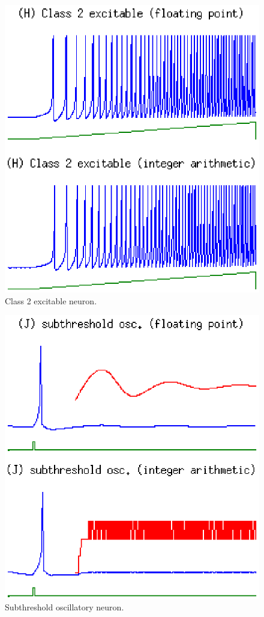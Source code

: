 \documentclass[journal]{./sty/IEEEtran}
\begin{document}
\begin{figure}
\centering
\includegraphics[scale=0.6]{imgs/izh_class_2_excitable}
\caption{Class 2 excitable neuron.\label{fig:excit2}}
\end{figure}

\begin{figure}
\centering
\includegraphics[scale=0.6]{imgs/izh_subthreshold_osc}
\caption{Subthreshold oscillatory neuron.\label{fig:osc}}
\end{figure}
\end{document}
